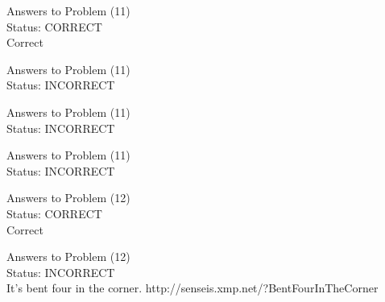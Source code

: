 \documentclass[11pt]{article}
\begin{document}
\begin{minipage}[t]{0.5\textwidth}
  {\centering
  
  Answers to Problem (11)\\
  Status: CORRECT\\
  Correct\\
  }
\end{minipage}
\begin{minipage}[t]{0.5\textwidth}
  {\centering
  
  Answers to Problem (11)\\
  Status: INCORRECT\\
  
  }
\end{minipage}
\begin{minipage}[t]{0.5\textwidth}
  {\centering
  
  Answers to Problem (11)\\
  Status: INCORRECT\\
  
  }
\end{minipage}
\begin{minipage}[t]{0.5\textwidth}
  {\centering
  
  Answers to Problem (11)\\
  Status: INCORRECT\\
  
  }
\end{minipage}
\begin{minipage}[t]{0.5\textwidth}
  {\centering
  
  Answers to Problem (12)\\
  Status: CORRECT\\
  Correct\\
  }
\end{minipage}
\begin{minipage}[t]{0.5\textwidth}
  {\centering
  
  Answers to Problem (12)\\
  Status: INCORRECT\\
  It's bent four in the corner. http://senseis.xmp.net/?BentFourInTheCorner\\
  }
\end{minipage}
\end{document}
